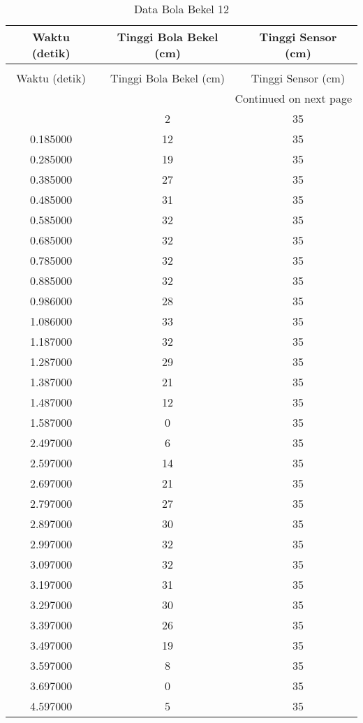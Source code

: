 \begin{longtable}[htbp]{|c|c|c|}
\caption{Data Bola Bekel 12} \\
\hline
Waktu (detik) & Tinggi Bola Bekel (cm) & Tinggi Sensor (cm) \\ \hline
\endfirsthead
\caption[]{Data Bola Bekel 12} \\
\hline
Waktu (detik) & Tinggi Bola Bekel (cm) & Tinggi Sensor (cm) \\ \hline
\endhead
\multicolumn{3}{r}{Continued on next page} \\
\endfoot
\endlastfoot
0.085000 & 2 & 35 \\ \hline
0.185000 & 12 & 35 \\ \hline
0.285000 & 19 & 35 \\ \hline
0.385000 & 27 & 35 \\ \hline
0.485000 & 31 & 35 \\ \hline
0.585000 & 32 & 35 \\ \hline
0.685000 & 32 & 35 \\ \hline
0.785000 & 32 & 35 \\ \hline
0.885000 & 32 & 35 \\ \hline
0.986000 & 28 & 35 \\ \hline
1.086000 & 33 & 35 \\ \hline
1.187000 & 32 & 35 \\ \hline
1.287000 & 29 & 35 \\ \hline
1.387000 & 21 & 35 \\ \hline
1.487000 & 12 & 35 \\ \hline
1.587000 & 0 & 35 \\ \hline
2.497000 & 6 & 35 \\ \hline
2.597000 & 14 & 35 \\ \hline
2.697000 & 21 & 35 \\ \hline
2.797000 & 27 & 35 \\ \hline
2.897000 & 30 & 35 \\ \hline
2.997000 & 32 & 35 \\ \hline
3.097000 & 32 & 35 \\ \hline
3.197000 & 31 & 35 \\ \hline
3.297000 & 30 & 35 \\ \hline
3.397000 & 26 & 35 \\ \hline
3.497000 & 19 & 35 \\ \hline
3.597000 & 8 & 35 \\ \hline
3.697000 & 0 & 35 \\ \hline
4.597000 & 5 & 35 \\ \hline

\end{longtable}
